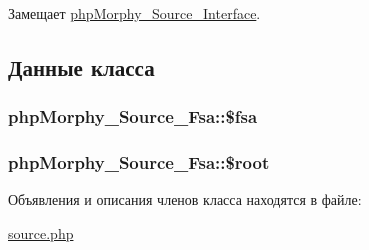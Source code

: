 Замещает \hyperlink{interfacephpMorphy__Source__Interface_ad764b0dbabb5651761c4af17b9a8da8d}{phpMorphy\_\-Source\_\-Interface}.



\subsection{Данные класса}
\hypertarget{classphpMorphy__Source__Fsa_a7efd6754366f9c272fa229091a4633df}{
\subsubsection[{\$fsa}]{\setlength{\rightskip}{0pt plus 5cm}phpMorphy\_\-Source\_\-Fsa::\$fsa}}
\label{classphpMorphy__Source__Fsa_a7efd6754366f9c272fa229091a4633df}
\hypertarget{classphpMorphy__Source__Fsa_ac6e34710b17c0a2f69f2f161f218eef1}{
\subsubsection[{\$root}]{\setlength{\rightskip}{0pt plus 5cm}phpMorphy\_\-Source\_\-Fsa::\$root}}
\label{classphpMorphy__Source__Fsa_ac6e34710b17c0a2f69f2f161f218eef1}


Объявления и описания членов класса находятся в файле:\begin{DoxyCompactItemize}
\item 
\hyperlink{source_8php}{source.php}\end{DoxyCompactItemize}
